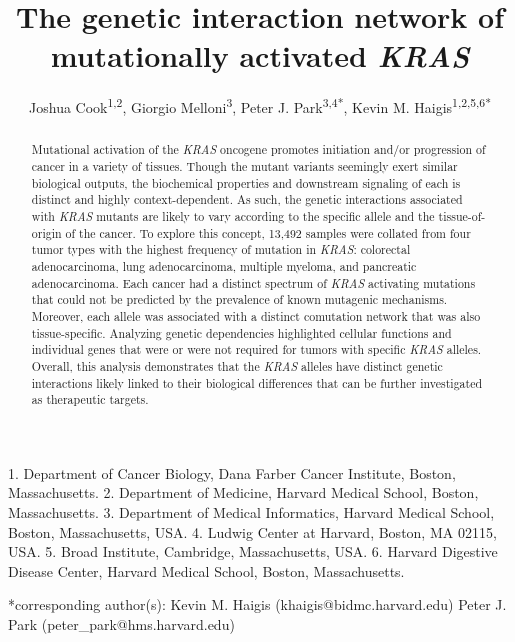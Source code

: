 \documentclass[english, 10pt, letterpaper]{article}
\title{The genetic interaction network of mutationally activated \emph{KRAS}}
\author{
    Joshua Cook\textsuperscript{1,2},
    Giorgio Melloni\textsuperscript{3}, 
    Peter J. Park\textsuperscript{3,4{*}}, 
    Kevin M. Haigis\textsuperscript{1,2,5,6{*}}
}
\newcommand{\KRAS}{\emph{KRAS}}
\begin{document}

\maketitle

\thispagestyle{fancy}

1. Department of Cancer Biology, Dana Farber Cancer Institute, Boston, Massachusetts.
2. Department of Medicine, Harvard Medical School, Boston, Massachusetts.
3. Department of Medical Informatics, Harvard Medical School, Boston, Massachusetts, USA.
4. Ludwig Center at Harvard, Boston, MA 02115, USA.
5. Broad Institute, Cambridge, Massachusetts, USA.
6. Harvard Digestive Disease Center, Harvard Medical School, Boston, Massachusetts.

{*}corresponding author(s):
\newline{} \hspace*{1cm} Kevin M. Haigis (khaigis@bidmc.harvard.edu)
\newline{} \hspace*{1cm} Peter J. Park (peter\_park@hms.harvard.edu)

\begin{abstract}
Mutational activation of the \KRAS{} oncogene promotes initiation and/or progression of cancer in a variety of tissues.
Though the mutant variants seemingly exert similar biological outputs, the biochemical properties and downstream signaling  of each is distinct and highly context-dependent.
As such, the genetic interactions associated with \KRAS{} mutants are likely to vary according to the specific allele and the tissue-of-origin of the cancer.
To explore this concept, 13,492 samples were collated from four tumor types with the highest frequency of mutation in \KRAS{}: colorectal adenocarcinoma, lung adenocarcinoma, multiple myeloma, and pancreatic adenocarcinoma.
Each cancer had a distinct spectrum of \KRAS{} activating mutations that could not be predicted by the prevalence of known mutagenic mechanisms.
Moreover, each allele was associated with a distinct comutation network that was also tissue-specific.
Analyzing genetic dependencies highlighted cellular functions and individual genes that were or were not required for tumors with specific \KRAS{} alleles.
Overall, this analysis demonstrates that the \KRAS{} alleles have distinct genetic interactions likely linked to their biological differences that can be further investigated as therapeutic targets.
\end{abstract}
\end{document}
